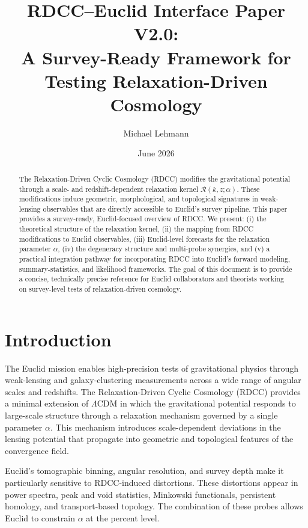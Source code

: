 \documentclass[11pt,a4paper]{article}
\title{\textbf{RDCC--Euclid Interface Paper V2.0:\\
A Survey-Ready Framework for Testing Relaxation-Driven Cosmology}}
\author[1]{Michael Lehmann}
\affil[1]{\small Independent Researcher, Relaxation-Driven Cyclic Cosmology (RDCC) Framework\\
\texttt{mi.lehmann@gmx.de}}
\date{\small June 2026}
\begin{document}
\maketitle


\begin{abstract}
The Relaxation-Driven Cyclic Cosmology (RDCC) modifies the gravitational potential
through a scale- and redshift-dependent relaxation kernel $\mathcal{R}(k,z;\alpha)$.
These modifications induce geometric, morphological, and topological signatures in
weak-lensing observables that are directly accessible to Euclid's survey pipeline.
This paper provides a survey-ready, Euclid-focused overview of RDCC. We present:
(i) the theoretical structure of the relaxation kernel, (ii) the mapping from RDCC
modifications to Euclid observables, (iii) Euclid-level forecasts for the relaxation
parameter $\alpha$, (iv) the degeneracy structure and multi-probe synergies, and
(v) a practical integration pathway for incorporating RDCC into Euclid's forward
modeling, summary-statistics, and likelihood frameworks. The goal of this document
is to provide a concise, technically precise reference for Euclid collaborators and
theorists working on survey-level tests of relaxation-driven cosmology.
\end{abstract}


\section{Introduction}

The Euclid mission enables high-precision tests of gravitational physics through
weak-lensing and galaxy-clustering measurements across a wide range of angular
scales and redshifts. The Relaxation-Driven Cyclic Cosmology (RDCC) provides a
minimal extension of $\Lambda$CDM in which the gravitational potential responds
to large-scale structure through a relaxation mechanism governed by a single
parameter $\alpha$. This mechanism introduces scale-dependent deviations in the
lensing potential that propagate into geometric and topological features of the
convergence field.

Euclid's tomographic binning, angular resolution, and survey depth make it
particularly sensitive to RDCC-induced distortions. These distortions appear in
power spectra, peak and void statistics, Minkowski functionals, persistent
homology, and transport-based topology. The combination of these probes allows
Euclid to constrain $\alpha$ at the percent level.
\end{document}
